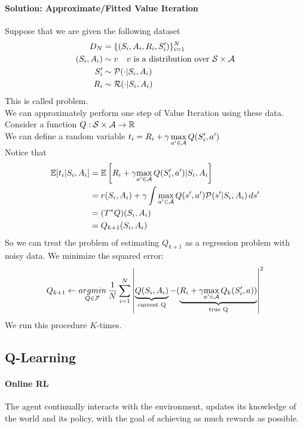 \documentclass[11pt]{article}
\begin{document}
\paragraph{Solution: Approximate/Fitted Value Iteration}
Suppose that we are given the following dataset
\begin{align}
	D_N &= \{(S_i, A_i, R_i, S'_i)\}_{i=1}^N \\
	(S_i, A_i) &\sim v \quad \text{$v$ is a distribution over $\mathcal{S} \times \mathcal{A}$} \\
	S'_i &\sim \mathcal{P}(\cdot|S_i, A_i) \\
	R_i &\sim \mathcal{R}(\cdot|S_i, A_i)
\end{align}
This is called  problem. \\
We can approximately perform one step of Value Iteration using these data. \\
Consider a function $Q: \mathcal{S} \times \mathcal{A} \rightarrow \mathbb{R}$ \\
We can define a random variable $t_i = R_i + \gamma\,\underset{a' \in \mathcal{A}}{\max}\, Q(S'_i, a')$ \\
Notice that 
\begin{align}
	\mathbb{E}[t_i|S_i, A_i] &= \mathbb{E}\left[ R_i + \gamma \underset{a' \in \mathcal{A}}{\max} \, Q(S'_i, a')|S_i, A_i \right] \\
	&= r(S_i, A_i) + \gamma \int \underset{a' \in \mathcal{A}}{\max}\, Q(s', a')\mathcal{P}(s'|S_i,A_i)\, ds' \\
	&= (T^*Q)(S_i, A_i) \\
	&= Q_{k+1}(S_i, A_i)
\end{align}
So we can treat the problem of estimating $Q_{k+1}$ as a regression problem with noisy data. We minimize the squared error:
$$Q_{k+1} \leftarrow \underset{Q \in \mathcal{F}}{argmin} \, \frac{1}{N} \sum_{i=1}^N \left | \underbrace{Q(S_i, A_i)}_{\text{current Q}} - (\underbrace{R_i + \gamma \underset{a' \in \mathcal{A}}{\max} \, Q_k(S'_i, a))}_{\text{true Q}}\right |^2$$
We run this procedure $K$-times. \\

\subsection{Q-Learning}
\paragraph{Online RL}
The agent continually interacts with the environment, updates its knowledge of the world and its policy, with the goal of achieving as much rewards as possible.\\
\end{document}
